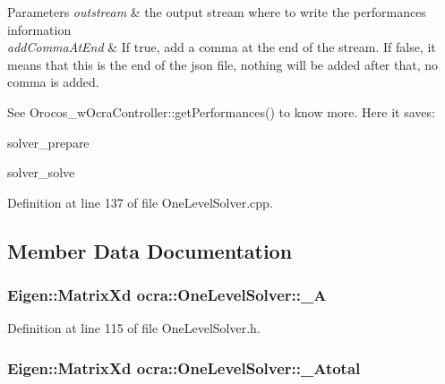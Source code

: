 \begin{DoxyParams}{Parameters}
{\em outstream} & the output stream where to write the performances information \\
\hline
{\em add\+Comma\+At\+End} & If true, add a comma at the end of the stream. If false, it means that this is the end of the json file, nothing will be added after that, no comma is added.\\
\hline
\end{DoxyParams}
See Orocos\+\_\+w\+Ocra\+Controller\+::get\+Performances() to know more. Here it saves\+:


\begin{DoxyItemize}
\item solver\+\_\+prepare
\item solver\+\_\+solve 
\end{DoxyItemize}

Definition at line 137 of file One\+Level\+Solver.\+cpp.



\subsection{Member Data Documentation}
\subsubsection[{\texorpdfstring{\+\_\+A}{_A}}]{\setlength{\rightskip}{0pt plus 5cm}Eigen\+::\+Matrix\+Xd ocra\+::\+One\+Level\+Solver\+::\+\_\+A\hspace{0.3cm}{\ttfamily [protected]}}\hypertarget{classocra_1_1OneLevelSolver_a95bb29fbd5260c74cc8d33078360b5fb}{}\label{classocra_1_1OneLevelSolver_a95bb29fbd5260c74cc8d33078360b5fb}


Definition at line 115 of file One\+Level\+Solver.\+h.

\subsubsection[{\texorpdfstring{\+\_\+\+Atotal}{_Atotal}}]{\setlength{\rightskip}{0pt plus 5cm}Eigen\+::\+Matrix\+Xd ocra\+::\+One\+Level\+Solver\+::\+\_\+\+Atotal\hspace{0.3cm}{\ttfamily [protected]}}\hypertarget{classocra_1_1OneLevelSolver_aa9b4b11abdc9c91af248b1f9e2a6d592}{}\label{classocra_1_1OneLevelSolver_aa9b4b11abdc9c91af248b1f9e2a6d592}


